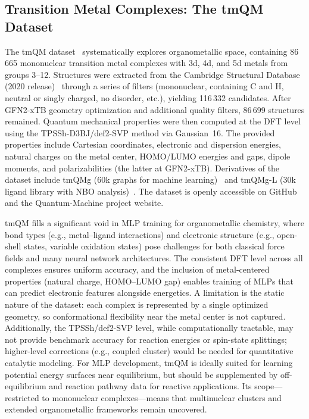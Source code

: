 \documentclass[12pt]{article}
\begin{document}
\subsection{Transition Metal Complexes: The tmQM Dataset}
\label{sec:tmqm}

The tmQM dataset~\cite{ds35-46} systematically explores organometallic space, containing 86\,665 mononuclear transition metal complexes with 3d, 4d, and 5d metals from groups 3–12. Structures were extracted from the Cambridge Structural Database (2020 release)~\cite{ds35-169} through a series of filters (mononuclear, containing C and H, neutral or singly charged, no disorder, etc.), yielding 116\,332 candidates. After GFN2-xTB geometry optimization and additional quality filters, 86\,699 structures remained. Quantum mechanical properties were then computed at the DFT level using the TPSSh-D3BJ/def2-SVP method via Gaussian~16. The provided properties include Cartesian coordinates, electronic and dispersion energies, natural charges on the metal center, HOMO/LUMO energies and gaps, dipole moments, and polarizabilities (the latter at GFN2-xTB). Derivatives of the dataset include tmQMg (60k graphs for machine learning)~\cite{ds35-170} and tmQMg-L (30k ligand library with NBO analysis)~\cite{ds35-171}. The dataset is openly accessible on GitHub and the Quantum-Machine project website.

tmQM fills a significant void in MLP training for organometallic chemistry, where bond types (e.g., metal–ligand interactions) and electronic structure (e.g., open-shell states, variable oxidation states) pose challenges for both classical force fields and many neural network architectures. The consistent DFT level across all complexes ensures uniform accuracy, and the inclusion of metal-centered properties (natural charge, HOMO–LUMO gap) enables training of MLPs that can predict electronic features alongside energetics. A limitation is the static nature of the dataset: each complex is represented by a single optimized geometry, so conformational flexibility near the metal center is not captured. Additionally, the TPSSh/def2-SVP level, while computationally tractable, may not provide benchmark accuracy for reaction energies or spin-state splittings; higher-level corrections (e.g., coupled cluster) would be needed for quantitative catalytic modeling. For MLP development, tmQM is ideally suited for learning potential energy surfaces near equilibrium, but should be supplemented by off-equilibrium and reaction pathway data for reactive applications. Its scope—restricted to mononuclear complexes—means that multinuclear clusters and extended organometallic frameworks remain uncovered.
\end{document}
